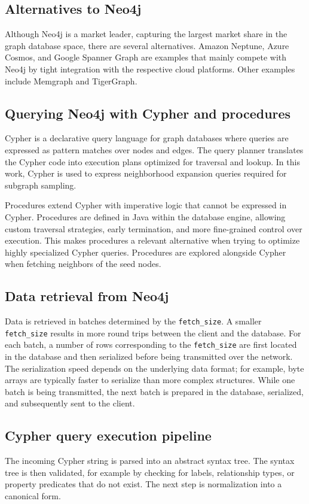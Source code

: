 \documentclass[PhD,single]{uclathes}
\begin{document}
\subsection{Alternatives to Neo4j}
Although Neo4j is a market leader, capturing the largest market share in the
graph database space, there are several alternatives. Amazon Neptune, Azure
Cosmos, and Google Spanner Graph are examples that mainly compete with Neo4j by
tight integration with the respective cloud platforms. Other examples include
Memgraph and TigerGraph.

\subsection{Querying Neo4j with Cypher and procedures}
Cypher is a declarative query language for graph databases where queries are
expressed as pattern matches over nodes and edges. The query planner translates
the Cypher code into execution plans optimized for traversal and lookup. In
this work, Cypher is used to express neighborhood expansion queries required
for subgraph sampling.

Procedures extend Cypher with imperative logic that cannot be expressed in
Cypher. Procedures are defined in Java within the database engine, allowing
custom traversal strategies, early termination, and more fine-grained control
over execution. This makes procedures a relevant alternative when trying to
optimize highly specialized Cypher queries. Procedures are explored alongside
Cypher when fetching neighbors of the seed nodes.

\subsection{Data retrieval from Neo4j}
Data is retrieved in batches determined by the \texttt{fetch\_size}. A smaller
\texttt{fetch\_size} results in more round trips between the client and the
database. For each batch, a number of rows corresponding to the
\texttt{fetch\_size} are first located in the database and then serialized
before being transmitted over the network. The serialization speed depends on
the underlying data format; for example, byte arrays are typically faster to
serialize than more complex structures. While one batch is being transmitted,
the next batch is prepared in the database, serialized, and subsequently sent
to the client.

\subsection{Cypher query execution pipeline}
The incoming Cypher string is parsed into an abstract syntax tree. The syntax
tree is then validated, for example by checking for labels, relationship types,
or property predicates that do not exist. The next step is normalization into a
canonical form.
\end{document}
